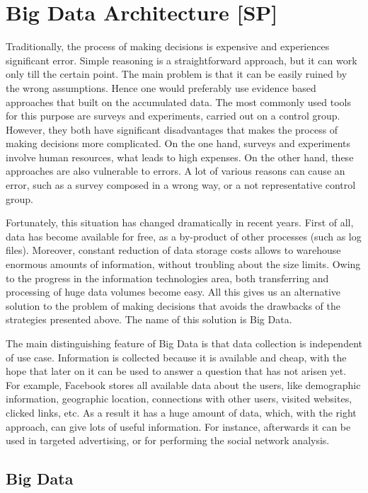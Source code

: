 \chapter{Big Data Architecture [SP]}
\label{chap:big_data_architecture}

Traditionally, the process of making decisions is expensive and experiences significant error.
Simple reasoning is a straightforward approach, but it can work only till the certain point.
The main problem is that it can be easily ruined by the wrong assumptions.
Hence one would preferably use evidence based approaches that built on the accumulated data.
The most commonly used tools for this purpose are surveys and experiments, carried out on a control group.   
However, they both have significant disadvantages that makes the process of making decisions more complicated. 
On the one hand, surveys and experiments involve human resources, what leads to high expenses.
On the other hand, these approaches are also vulnerable to errors.
A lot of various reasons can cause an error, such as a survey composed in a wrong way, or a not representative control group.
 
Fortunately, this situation has changed dramatically in recent years.
First of all, data has become available for free, as a by-product of other processes (such as log files).
Moreover, constant reduction of data storage costs allows to warehouse enormous amounts of information, without troubling about the size limits.
Owing to the progress in the information technologies area, both transferring and processing of huge data volumes become easy.
All this gives us an alternative solution to the problem of making decisions that avoids the drawbacks of the strategies presented above.
The name of this solution is Big Data.

The main distinguishing feature of Big Data is that data collection is independent of use case.
Information is collected because it is available and cheap, with the hope that later on it can be used to answer a question that has not arisen yet.
For example, Facebook stores all available data about the users, like demographic information, geographic location, connections with other users, visited websites, clicked links, etc.
As a result it has a huge amount of data, which, with the right approach, can give lots of useful information. 
For instance, afterwards it can be used in targeted advertising, or for performing the social network analysis.

\section{Big Data}

